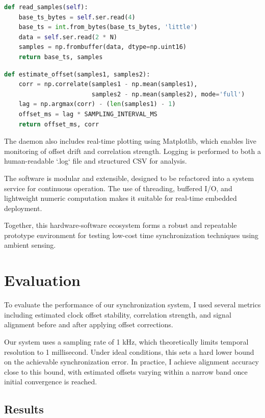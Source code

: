 \documentclass[sigconf]{acmart}
\begin{document}
\begin{lstlisting}[language=Python,caption=Serial reader snippet]
def read_samples(self):
    base_ts_bytes = self.ser.read(4)
    base_ts = int.from_bytes(base_ts_bytes, 'little')
    data = self.ser.read(2 * N)
    samples = np.frombuffer(data, dtype=np.uint16)
    return base_ts, samples
\end{lstlisting}

\begin{lstlisting}[language=Python,caption=Cross-correlation for offset estimation]
def estimate_offset(samples1, samples2):
    corr = np.correlate(samples1 - np.mean(samples1),
                        samples2 - np.mean(samples2), mode='full')
    lag = np.argmax(corr) - (len(samples1) - 1)
    offset_ms = lag * SAMPLING_INTERVAL_MS
    return offset_ms, corr
\end{lstlisting}

The daemon also includes real-time plotting using Matplotlib, which enables live monitoring of offset drift and correlation strength. Logging is performed to both a human-readable `.log` file and structured CSV for analysis.

The software is modular and extensible, designed to be refactored into a system service for continuous operation. The use of threading, buffered I/O, and lightweight numeric computation makes it suitable for real-time embedded deployment.

Together, this hardware-software ecosystem forms a robust and repeatable prototype environment for testing low-cost time synchronization techniques using ambient sensing.

\section{Evaluation}

To evaluate the performance of our synchronization system, I used several metrics including estimated clock offset stability, correlation strength, and signal alignment before and after applying offset corrections.

Our system uses a sampling rate of 1 kHz, which theoretically limits temporal resolution to 1 millisecond. Under ideal conditions, this sets a hard lower bound on the achievable synchronization error. In practice, I achieve alignment accuracy close to this bound, with estimated offsets varying within a narrow band once initial convergence is reached.

\subsection{Results}
\end{document}
